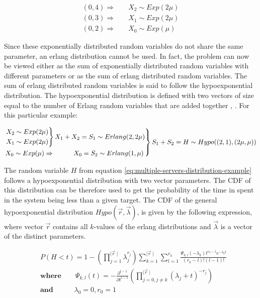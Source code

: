 \begin{align}
    (0,4) \Rightarrow \quad & X_2 \sim Exp(2\mu) \nonumber \\
    (0,3) \Rightarrow \quad & X_1 \sim Exp(2\mu) \\
    (0,2) \Rightarrow \quad & X_0 \sim Exp(\mu) \nonumber
\end{align}

Since these exponentially distributed random variables do not share the same 
parameter, an erlang distribution cannot be used. 
In fact, the problem can now be viewed either as the sum of exponentially 
distributed random variables with different parameters or as the sum of 
erlang distributed random variables.
The sum of erlang distributed random variables is said to follow the 
hypoexponential distribution. 
The hypoexponential distribution is defined with two vectors of size equal
to the number of Erlang random variables that are added together
\cite{Akkouchi2008}, \cite{Smaili2013}. 
For this particular example:

\begin{align} \label{eq:multiple-servers-distribution-example}
    \begin{rcases}
        \begin{rcases}
            X_2 \sim Exp(2\mu) \\
            X_1 \sim Exp(2\mu)
        \end{rcases}
        X_1 + X_2 = S_1 \sim Erlang(2, 2\mu) \\
        X_0 \sim Exp(\mu) \Rightarrow \hspace{1cm} X_0 = S_2 \sim Erlang(1, \mu)
    \end{rcases}
    S_1 + S_2 = H \sim Hypo((2,1), (2\mu, \mu)) 
\end{align}

The random variable \(H\) from equation 
\ref{eq:multiple-servers-distribution-example} follows a hypoexponential 
distribution with two vector parameters. 
The CDF of this distribution can be therefore used to get the probability of the 
time in spent in the system being less than a given target.
The CDF of the general hypoexponential distribution \(Hypo(\vec{r}, 
\vec{\lambda})\), is given by the following expression, where vector \(\vec{r}\) 
contains all \(k\)-values of the erlang distributions and \(\vec{\lambda}\) 
is a vector of the distinct parameters.

\begin{align} \label{eq:general-cdf-hypoexponential}
    & P(H < t) = 1 - \left( \prod_{j=1}^{\mid \vec{r} \mid} \lambda_j^{r_j} \right) 
    \sum_{k=1}^{\mid \vec{r} \mid} \sum_{l=1}^{r_k} \frac{\Psi_{k,l}(-\lambda_k)t^{r_k - l} 
    e^{-\lambda_k t}}
    {(r_k - l)! (l - 1)!} \nonumber \\ 
    & \textbf{where} \qquad \Psi_{k,l}(t) = - \frac{\partial^{l - 1}}
    {\partial t ^{l - 1}} \left( \prod_{j = 0, j \neq k}^{\mid \vec{r} \mid} 
    (\lambda_j + t)^{-r_j} \right) \nonumber \\
    & \textbf{and} \quad \qquad \lambda_0 = 0, r_0 = 1
\end{align}



